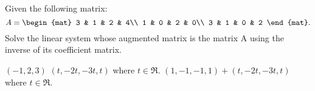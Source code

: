 

\begin{Exercise}[
name={},
title={}, 
difficulty=0,
origin={\cite{BS}}]
Given the following matrix:
\[
A=
\begin{mat}
3 & 1 & 2 & 4\\
1 & 0 & 2 & 0\\
3 & 1 & 0 & 2
\end{mat}.
\]
Solve the linear system whose augmented matrix is the matrix A using the
inverse of its coefficient matrix.
\end{Exercise}
\begin{Answer}
\Question $(-1, 2, 3)$
\Question $(t, -2t, -3t, t)$ where $t\in\Re$.
\Question $(1, -1, -1, 1)+(t, -2t, -3t, t)$ where $t\in\Re$.
\end{Answer}
